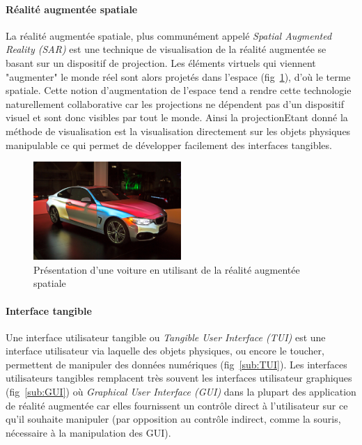\paragraph{Réalité augmentée spatiale}
La réalité augmentée spatiale, plus communément appelé \emph{Spatial Augmented Reality (SAR)} est une technique de visualisation de la réalité augmentée se basant sur un dispositif de projection. Les éléments virtuels qui viennent "augmenter" le monde réel sont alors projetés dans l'espace (fig~\ref{fig:SAR}), d'où le terme spatiale. Cette notion d'augmentation de l'espace tend a rendre cette technologie naturellement collaborative car les projections ne dépendent pas d'un dispositif visuel et sont donc visibles par tout le monde. Ainsi la projectionEtant donné la méthode de visualisation est la visualisation directement sur les objets physiques manipulable ce qui permet de développer facilement des interfaces tangibles.

\begin{figure}[H]
\centering
\includegraphics[width=0.5\textwidth]{images/SARMappingCar2}
\caption{Présentation d'une voiture en utilisant de la réalité augmentée spatiale\protect\footnotemark}
\label{fig:SAR}
\end{figure}

\paragraph{Interface tangible}
Une interface utilisateur tangible ou \emph{Tangible User Interface (TUI)} est une interface utilisateur via laquelle des objets physiques, ou encore le toucher, permettent de manipuler des données numériques (fig~\ref{sub:TUI}). Les interfaces utilisateurs tangibles remplacent très souvent les interfaces utilisateur graphiques (fig~\ref{sub:GUI}) où \emph{Graphical User Interface (GUI)} dans la plupart des application de réalité augmentée car elles fournissent un contrôle direct à l'utilisateur sur ce qu'il souhaite manipuler (par opposition au contrôle indirect, comme la souris, nécessaire à la manipulation des GUI).

